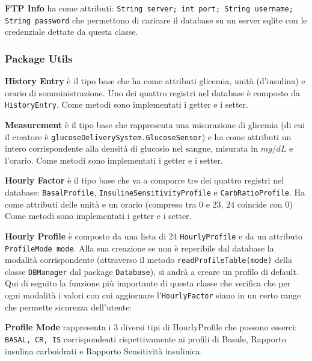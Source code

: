 \documentclass[twocolumn]{article}
\begin{document}
\textbf{FTP Info}
\newline ha come attributi: \texttt{String server; int port; String username; String password} che permettono di caricare il database su un server sqlite con le credenziale dettate da questa classe.


\subsubsection{Package Utils}

\textbf{History Entry}
\newline è il tipo base che ha come attributi glicemia, unità (d'insulina) e orario di somministrazione. Uno dei quattro registri nel database è composto da \texttt{HistoryEntry}. Come metodi sono implementati i getter e i setter.

\textbf{Measurement}
\newline è il tipo base che rappresenta una misurazione di glicemia (di cui il creatore è \texttt{glucoseDeliverySystem.GlucoseSensor}) e ha come attributi un intero corrispondente alla densità di glucosio nel sangue, misurata in $mg/dL$ e l'orario. Come metodi sono implementati i getter e i setter.

\textbf{Hourly Factor}
\newline è il tipo base che va a comporre tre dei quattro registri nel database: \texttt{BasalProfile}, \texttt{InsulineSensitivityProfile} e \texttt{CarbRatioProfile}. Ha come attributi delle unità e un orario (compreso tra $0$ e $23$, $24$ coincide con $0$) Come metodi sono implementati i getter e i setter.

\textbf{Hourly Profile}
\newline è composto da una lista di 24 \texttt{HourlyProfile} e da un attributo \texttt{ProfileMode mode}. Alla sua creazione se non è reperibile dal database la modalità corrispondente (attraverso il metodo \texttt{readProfileTable(mode)} della classe \texttt{DBManager} dal package \texttt{Database}), si andrà a creare un profilo di default. Qui di seguito la funzione più importante di questa classe che verifica che per ogni modalità i valori con cui aggiornare l'\texttt{HourlyFactor} siano in un certo range che permette sicurezza dell'utente:



\textbf{Profile Mode}
\newline rappresenta i 3 diversi tipi di HourlyProfile che possono esserci: \texttt{BASAL, CR, IS} corrispondenti rispettivamente ai profili di Basale, Rapporto insulina carboidrati e Rapporto Sensitività insulinica.
\end{document}
